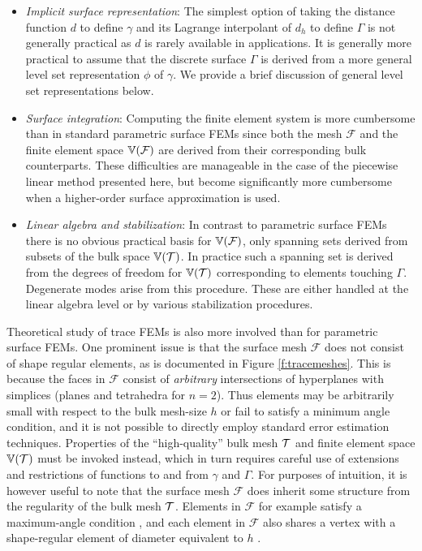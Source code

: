 \begin{itemize}
\item
  {\it Implicit surface representation}: The simplest option of taking the distance function $d$ to define $\gamma$ and its Lagrange interpolant of $d_h$ to define $\Gamma$ is not generally practical as $d$ is rarely available in applications. It is generally more practical to assume that the discrete surface $\Gamma$ is derived from a more general level set representation $\phi$ of $\gamma$.   We provide a brief discussion of general level set representations below.  
\item
{\it Surface integration}: Computing the finite element system is more cumbersome than in standard parametric surface FEMs since both the mesh $\mathcal{F}$ and the finite element space $\mathbb{V}(\mathcal F)$ are derived from their corresponding bulk counterparts. These difficulties are manageable in the case of the piecewise linear method presented here, but become significantly more cumbersome when a higher-order surface approximation is used.
\item
{\it Linear algebra and stabilization}: In contrast to parametric surface FEMs there is no obvious practical basis for $\mathbb{V}(\mathcal F)$, only spanning sets derived from subsets of the bulk space $\mathbb{V}(\mathcal T)$.  In practice such a spanning set is derived from the degrees of freedom for $\mathbb{V}(\mathcal T)$ corresponding to elements touching $\Gamma$.  Degenerate modes arise from this procedure.  These are either handled at the linear algebra level or by various stabilization procedures.

\end{itemize}

Theoretical study of trace FEMs is also more involved than for parametric surface FEMs.   One prominent issue is that the surface mesh $\mathcal{F}$ does not consist of shape regular elements, as is documented in Figure \ref{f:tracemeshes}.  This is because the faces in $\mathcal{F}$ consist of {\it arbitrary} intersections of hyperplanes with simplices (planes and tetrahedra for $n=2$).  Thus elements may be arbitrarily small with respect to the bulk mesh-size $h$ or fail to satisfy a minimum angle condition, and it is not possible to directly employ standard error estimation techniques.  Properties of the ``high-quality'' bulk mesh $\mathcal{T}$ and finite element space $\mathbb{V}(\mathcal T)$ must be invoked instead, which in turn requires careful use of extensions and restrictions of functions to and from $\gamma$ and $\Gamma$.   For purposes of intuition, it is however useful to note that the surface mesh $\mathcal{F}$ does inherit some structure from the regularity of the bulk mesh $\mathcal{T}$.  Elements in $\mathcal{F}$ for example satisfy a maximum-angle condition \cite{ORX12}, and each element in $\mathcal{F}$ also shares a vertex with a shape-regular element of diameter equivalent to $h$ \cite{DO12}.


